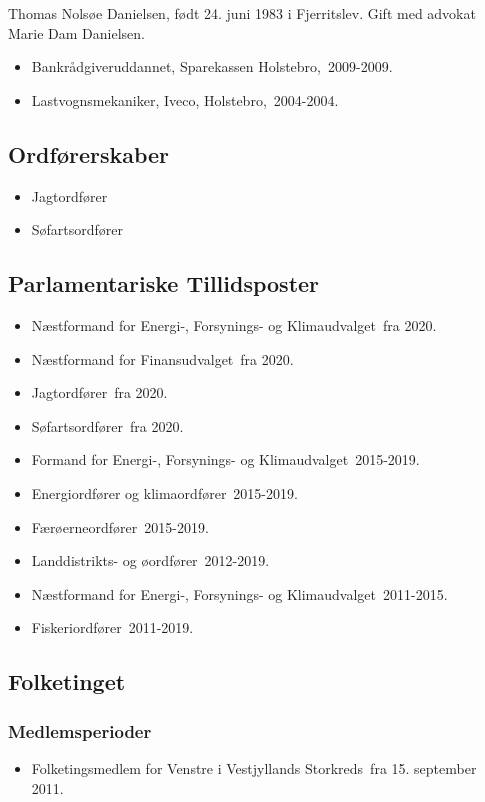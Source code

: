 \documentclass[11pt, a4paper]{awesome-cv}
\begin{document}
\makecvheader[R]
\makelettertitle
\begin{cvletter}
Thomas Nolsøe Danielsen, født 24. juni 1983 i Fjerritslev. Gift med advokat Marie Dam Danielsen.

\begin{itemize}
\item Bankrådgiveruddannet, Sparekassen Holstebro, 2009-2009.
\item Lastvognsmekaniker, Iveco, Holstebro, 2004-2004.
\end{itemize}
\subsection*{Ordførerskaber}
\begin{itemize}
\item Jagtordfører
\item Søfartsordfører
\end{itemize}
\subsection*{Parlamentariske Tillidsposter}
\begin{itemize}
\item Næstformand for Energi-, Forsynings- og Klimaudvalget fra 2020.
\item Næstformand for Finansudvalget fra 2020.
\item Jagtordfører fra 2020.
\item Søfartsordfører fra 2020.
\item Formand for Energi-, Forsynings- og Klimaudvalget 2015-2019.
\item Energiordfører og klimaordfører 2015-2019.
\item Færøerneordfører 2015-2019.
\item Landdistrikts- og øordfører 2012-2019.
\item Næstformand for Energi-, Forsynings- og Klimaudvalget 2011-2015.
\item Fiskeriordfører 2011-2019.
\end{itemize}
\subsection*{Folketinget}
\subsubsection*{Medlemsperioder}
\begin{itemize}
\item Folketingsmedlem for Venstre i Vestjyllands Storkreds fra 15. september 2011.
\end{itemize}

\end{cvletter}
\end{document}
